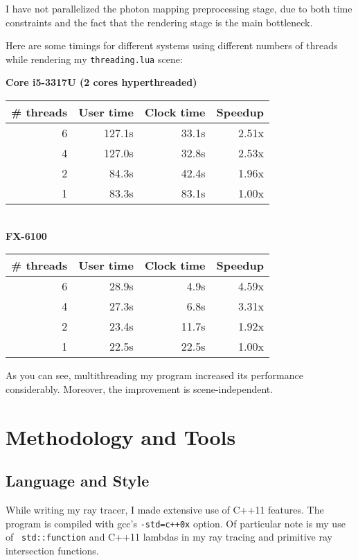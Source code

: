 \documentclass{article}
\begin{document}
I have not parallelized the photon mapping preprocessing stage, due to both time
constraints and the fact that the rendering stage is the main bottleneck.

Here are some timings for different systems using different numbers of threads
while rendering my {\tt threading.lua} scene:

\begin{center}
\noindent\textbf{Core i5-3317U (2 cores hyperthreaded)} \\
\begin{tabular}{|r|r|r|r|} \hline
  \# threads & User time & Clock time & Speedup \\\hline
           6 & 127.1s & 33.1s & 2.51x \\\hline
  4 & 127.0s & 32.8s & 2.53x \\\hline
  2 & 84.3s & 42.4s & 1.96x \\\hline
  1 & 83.3s & 83.1s & 1.00x \\\hline
\end{tabular} \\

\noindent\textbf{FX-6100} \\
  \begin{tabular}{|r|r|r|r|} \hline
  \# threads & User time & Clock time & Speedup \\\hline
           6 & 28.9s & 4.9s & 4.59x \\\hline
           4 & 27.3s & 6.8s & 3.31x \\\hline
           2 & 23.4s & 11.7s & 1.92x \\\hline
           1 & 22.5s & 22.5s & 1.00x \\\hline
  \end{tabular}

\end{center}

As you can see, multithreading my program increased its performance
considerably. Moreover, the improvement is scene-independent.

\section{Methodology and Tools}

\subsection{Language and Style}

While writing my ray tracer, I made extensive use of C++11 features. The program
is compiled with gcc's {\tt -std=c++0x} option. Of particular note is my use of {\tt
std::function} and C++11 lambdas in my ray tracing and primitive ray intersection
functions.
\end{document}
